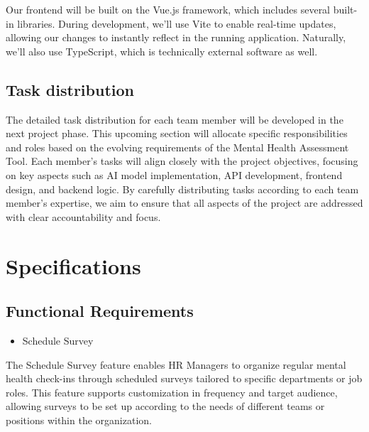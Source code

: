 \documentclass[conference]{IEEEtran}
\begin{document}
            Our frontend will be built on the Vue.js framework, which includes several 
            built-in libraries. During development, we’ll use Vite to enable real-time 
            updates, allowing our changes to instantly reflect in the running application. 
            Naturally, we’ll also use TypeScript, which is technically external 
            software as well.
            \newline

        \subsection {Task distribution}

            The detailed task distribution for each team member will be 
            developed in the next project phase. This upcoming section 
            will allocate specific responsibilities and roles based 
            on the evolving requirements of the Mental Health Assessment 
            Tool. Each member’s tasks will align closely with the project 
            objectives, focusing on key aspects such as AI model 
            implementation, API development, frontend design, and backend 
            logic. By carefully distributing tasks according to each team 
            member’s expertise, we aim to ensure that all aspects of the 
            project are addressed with clear accountability and focus.
            \newline
    
    \section{Specifications}

        \subsection {Functional Requirements}
   
            \begin{itemize}
                \item Schedule Survey 
            \end{itemize}

            The Schedule Survey feature enables HR Managers to organize 
            regular mental health check-ins through scheduled surveys 
            tailored to specific departments or job roles. This feature 
            supports customization in frequency and target audience, 
            allowing surveys to be set up according to the needs of 
            different teams or positions within the organization. 
            \newline
\end{document}
